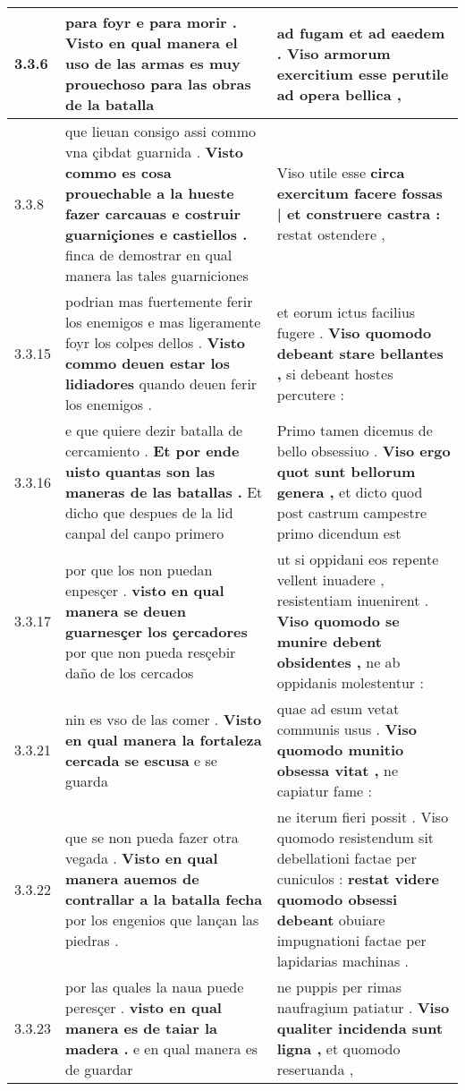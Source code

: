 \begin{tabular}{|p{1cm}|p{6.5cm}|p{6.5cm}|}
3.3.6 & para foyr e para morir . \textbf{ Visto en qual manera el uso de las armas es muy prouechoso } para las obras de la batalla & ad fugam et ad eaedem . \textbf{ Viso armorum exercitium } esse perutile ad opera bellica , \\\hline
3.3.8 & que lieuan consigo assi commo vna çibdat guarnida . \textbf{ Visto commo es cosa prouechable a la hueste fazer carcauas e costruir guarniçiones e castiellos . } finca de demostrar en qual manera las tales guarniciones & Viso utile esse \textbf{ circa exercitum facere fossas | et construere castra : } restat ostendere , \\\hline
3.3.15 & podrian mas fuertemente ferir los enemigos e mas ligeramente foyr los colpes dellos . \textbf{ Visto commo deuen estar los lidiadores } quando deuen ferir los enemigos . & et eorum ictus facilius fugere . \textbf{ Viso quomodo debeant stare bellantes , } si debeant hostes percutere : \\\hline
3.3.16 & e que quiere dezir batalla de cercamiento . \textbf{ Et por ende uisto quantas son las maneras de las batallas . } Et dicho que despues de la lid canpal del canpo primero & Primo tamen dicemus de bello obsessiuo . \textbf{ Viso ergo quot sunt bellorum genera , } et dicto quod post castrum campestre primo dicendum est \\\hline
3.3.17 & por que los non puedan enpesçer . \textbf{ visto en qual manera se deuen guarnesçer los çercadores } por que non pueda resçebir daño de los cercados & ut si oppidani eos repente vellent inuadere , resistentiam inuenirent . \textbf{ Viso quomodo se munire debent obsidentes , } ne ab oppidanis molestentur : \\\hline
3.3.21 & nin es vso de las comer . \textbf{ Visto en qual manera la fortaleza cercada se escusa } e se guarda & quae ad esum vetat communis usus . \textbf{ Viso quomodo munitio obsessa vitat , } ne capiatur fame : \\\hline
3.3.22 & que se non pueda fazer otra vegada . \textbf{ Visto en qual manera auemos de contrallar a la batalla fecha } por los engenios que lançan las piedras . & ne iterum fieri possit . Viso quomodo resistendum sit debellationi factae per cuniculos : \textbf{ restat videre quomodo obsessi debeant } obuiare impugnationi factae per lapidarias machinas . \\\hline
3.3.23 & por las quales la naua puede peresçer . \textbf{ visto en qual manera es de taiar la madera . } e en qual manera es de guardar & ne puppis per rimas naufragium patiatur . \textbf{ Viso qualiter incidenda sunt ligna , } et quomodo reseruanda , \\\hline

\end{tabular}
